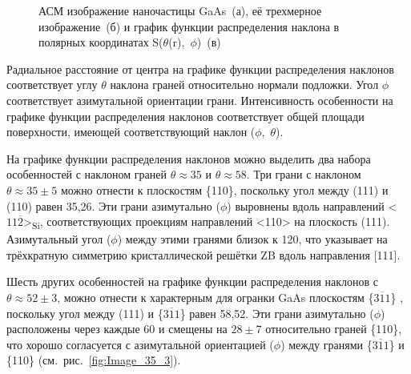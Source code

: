 \begin{figure}[ht]   \caption{АСМ изображение
		наночастицы GaAs~(а), её трехмерное изображение~(б) и график функции
		распределения наклона в полярных координатах
S(\(\theta\)(r),~\(\phi\))~(в)}\label{fig:Image_35} \end{figure}

Радиальное расстояние от центра на графике функции распределения наклонов
соответствует углу \(\theta\) наклона граней относительно нормали подложки.
Угол \(\phi\) соответствует азимутальной ориентации грани. Интенсивность
особенности на графике функции распределения наклонов соответствует общей
площади поверхности, имеющей соответствующий наклон (\(\phi\),~\(\theta\)).

На графике функции распределения наклонов можно выделить два набора
особенностей с наклоном граней \(\theta\approx 35\){\textdegree} и
\(\theta\approx 58\){\textdegree}. Три грани с наклоном \(\theta\approx 35 \pm
5\){\textdegree} можно отнести к плоскостям \{110\}, поскольку угол между (111)
и (110) равен 35,26{\textdegree}. Эти грани азимутально (\(\phi\)) выровнены
вдоль направлений <\(11\overline{2}\)>\textsubscript{Si}, соответствующих
проекциям направлений <110> на плоскость (111). Азимутальный угол (\(\phi\))
между этими гранями близок к 120{\textdegree}, что указывает на трёхкратную
симметрию кристаллической решётки ZB вдоль направления [111].

Шесть других особенностей на графике функции распределения наклонов с
\(\theta\approx 52 \pm 3\){\textdegree}, можно отнести к характерным для
огранки GaAs плоскостям \{\(3\overline{1}1\)\} \cite{Yeu2019, wong2010},
поскольку угол между (111) и \{\(3\overline{1}1\)\} равен 58,52{\textdegree}.
Эти грани азимутально (\(\phi\)) расположены через каждые 60{\textdegree} и
смещены на \(28 \pm 7\){\textdegree} относительно граней \{110\}, что хорошо
согласуется с азимутальной ориентацией (\(\phi\)) между гранями
\{\(3\overline{1}1\)\} и \{110\} (см.~рис.~\cref{fig:Image_35_3}).

